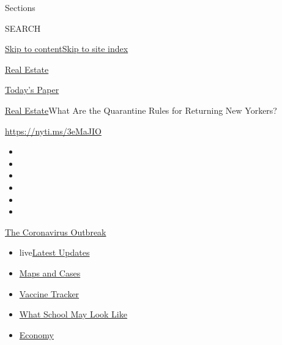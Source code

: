 Sections

SEARCH

\protect\hyperlink{site-content}{Skip to
content}\protect\hyperlink{site-index}{Skip to site index}

\href{https://www.nytimes.com/section/realestate}{Real Estate}

\href{https://myaccount.nytimes.com/auth/login?response_type=cookie\&client_id=vi}{}

\href{https://www.nytimes.com/section/todayspaper}{Today's Paper}

\href{/section/realestate}{Real Estate}\textbar{}What Are the Quarantine
Rules for Returning New Yorkers?

\url{https://nyti.ms/3eMaJIO}

\begin{itemize}
\item
\item
\item
\item
\item
\item
\end{itemize}

\href{https://www.nytimes.com/news-event/coronavirus?action=click\&pgtype=Article\&state=default\&region=TOP_BANNER\&context=storylines_menu}{The
Coronavirus Outbreak}

\begin{itemize}
\tightlist
\item
  live\href{https://www.nytimes.com/2020/08/01/world/coronavirus-covid-19.html?action=click\&pgtype=Article\&state=default\&region=TOP_BANNER\&context=storylines_menu}{Latest
  Updates}
\item
  \href{https://www.nytimes.com/interactive/2020/us/coronavirus-us-cases.html?action=click\&pgtype=Article\&state=default\&region=TOP_BANNER\&context=storylines_menu}{Maps
  and Cases}
\item
  \href{https://www.nytimes.com/interactive/2020/science/coronavirus-vaccine-tracker.html?action=click\&pgtype=Article\&state=default\&region=TOP_BANNER\&context=storylines_menu}{Vaccine
  Tracker}
\item
  \href{https://www.nytimes.com/interactive/2020/07/29/us/schools-reopening-coronavirus.html?action=click\&pgtype=Article\&state=default\&region=TOP_BANNER\&context=storylines_menu}{What
  School May Look Like}
\item
  \href{https://www.nytimes.com/live/2020/07/31/business/stock-market-today-coronavirus?action=click\&pgtype=Article\&state=default\&region=TOP_BANNER\&context=storylines_menu}{Economy}
\end{itemize}

